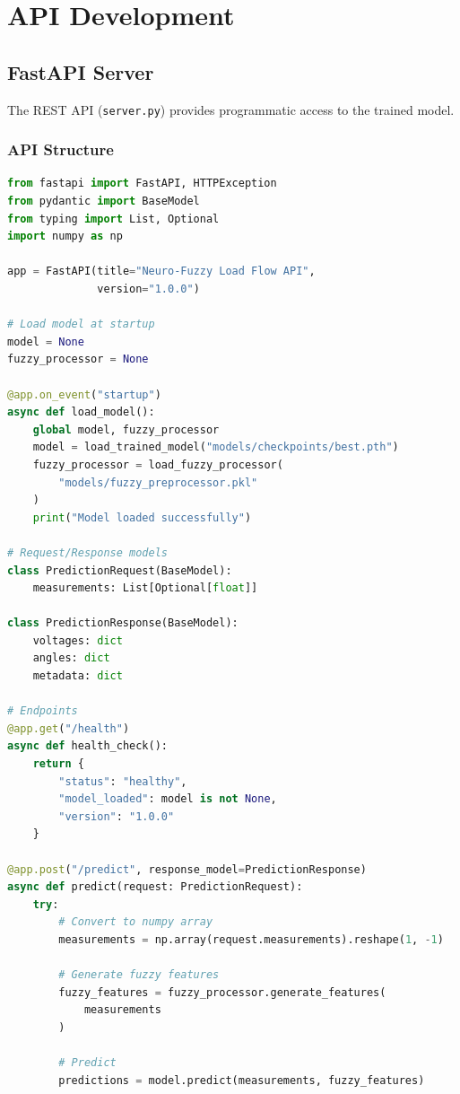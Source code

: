 \documentclass[12pt,a4paper]{report}
\begin{document}
\section{API Development}

\subsection{FastAPI Server}

The REST API (\texttt{server.py}) provides programmatic access to the trained model.

\subsubsection{API Structure}

\begin{lstlisting}[language=Python, caption={FastAPI Server Implementation}]
from fastapi import FastAPI, HTTPException
from pydantic import BaseModel
from typing import List, Optional
import numpy as np

app = FastAPI(title="Neuro-Fuzzy Load Flow API",
              version="1.0.0")

# Load model at startup
model = None
fuzzy_processor = None

@app.on_event("startup")
async def load_model():
    global model, fuzzy_processor
    model = load_trained_model("models/checkpoints/best.pth")
    fuzzy_processor = load_fuzzy_processor(
        "models/fuzzy_preprocessor.pkl"
    )
    print("Model loaded successfully")

# Request/Response models
class PredictionRequest(BaseModel):
    measurements: List[Optional[float]]
    
class PredictionResponse(BaseModel):
    voltages: dict
    angles: dict
    metadata: dict

# Endpoints
@app.get("/health")
async def health_check():
    return {
        "status": "healthy",
        "model_loaded": model is not None,
        "version": "1.0.0"
    }

@app.post("/predict", response_model=PredictionResponse)
async def predict(request: PredictionRequest):
    try:
        # Convert to numpy array
        measurements = np.array(request.measurements).reshape(1, -1)
        
        # Generate fuzzy features
        fuzzy_features = fuzzy_processor.generate_features(
            measurements
        )
        
        # Predict
        predictions = model.predict(measurements, fuzzy_features)
        

\end{lstlisting}
\end{document}
